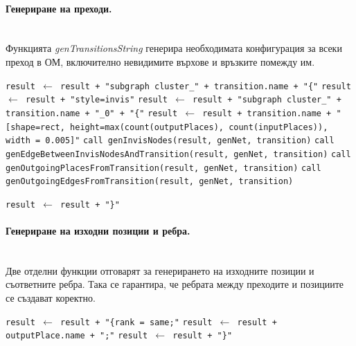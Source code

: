 \paragraph{Генериране на преходи.}
\mbox{}\\
Функцията \textit{genTransitionsString} генерира необходимата конфигурация за всеки преход в ОМ, включително невидимите върхове и връзките помежду им.

\begin{algorithm}[H]
\caption{genTransitionsString(genNet, result)}
\begin{algorithmic}
    \State \texttt{result $\gets$ result + "subgraph cluster\_"{} + transition.name + "\{"}
    \State \texttt{result $\gets$ result + "style=invis"}
    \State \texttt{result $\gets$ result + "subgraph cluster\_"{} + transition.name + "\_0"{} + "\{"}
    \State \texttt{result $\gets$ result + transition.name + 
    "[shape=rect, height=max(count(outputPlaces), count(inputPlaces)), width = 0.005]"}
    \State \texttt{call genInvisNodes(result, genNet, transition)}
    \State \texttt{call genEdgeBetweenInvisNodesAndTransition(result, genNet, transition)}
    \State \texttt{call genOutgoingPlacesFromTransition(result, genNet, transition)}
    \State \texttt{call genOutgoingEdgesFromTransition(result, genNet, transition)}

    \texttt{result $\gets$ result + "\}"}
\EndFor
\end{algorithmic}
\end{algorithm}

\paragraph{Генериране на изходни позиции и ребра.}
\mbox{}\\
Две отделни функции отговарят за генерирането на изходните позиции и съответните ребра. Така се гарантира, че ребрата между преходите и позициите се създават коректно.

\begin{algorithm}[H]
\caption{genOutgoingPlacesFromTransition(genNet, result, transition)}
\begin{algorithmic}
\State \texttt{result $\gets$ result + "\{rank = same;"}
    \State \texttt{result $\gets$ result + outputPlace.name + ";"}
\EndFor
\State \texttt{result $\gets$ result + "\}"}
\end{algorithmic}
\end{algorithm}

